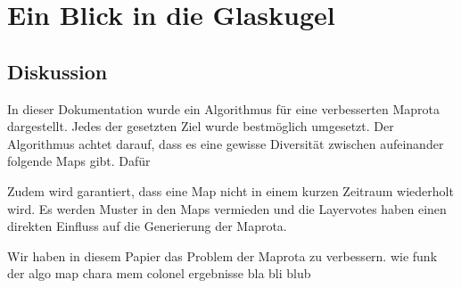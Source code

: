 \section{Ein Blick in die Glaskugel}
    \subsection{Diskussion}
        
    	In dieser Dokumentation wurde ein Algorithmus für eine verbesserten Maprota dargestellt.
        Jedes der gesetzten Ziel wurde bestmöglich umgesetzt. 
        Der Algorithmus achtet darauf, dass es eine gewisse Diversität zwischen aufeinander folgende Maps gibt.
        Dafür  



        Zudem wird garantiert, dass eine Map nicht in einem kurzen Zeitraum wiederholt wird. Es werden Muster in den 
        Maps vermieden und die Layervotes haben einen direkten Einfluss auf die Generierung der Maprota.


        Wir haben in diesem Papier das Problem der Maprota zu verbessern. 
        wie funk der algo
        map chara
        mem colonel 
        ergebnisse
        bla bli blub


